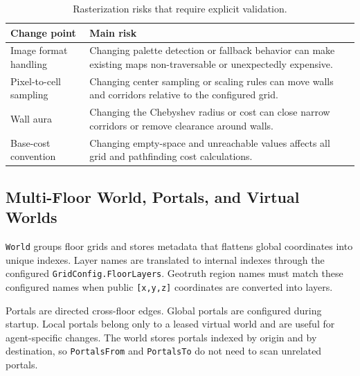 \documentclass[12pt,a4paper]{report}
\begin{document}
\begin{table}[H]
\centering
\begin{tabular}{|p{}|p{}|}
\hline
\textbf{Change point} & \textbf{Main risk} \\
\hline
Image format handling &
Changing palette detection or fallback behavior can make existing maps
non-traversable or unexpectedly expensive. \\
\hline
Pixel-to-cell sampling &
Changing center sampling or scaling rules can move walls and corridors relative
to the configured grid. \\
\hline
Wall aura &
Changing the Chebyshev radius or cost can close narrow corridors or remove
clearance around walls. \\
\hline
Base-cost convention &
Changing empty-space and unreachable values affects all grid and pathfinding
cost calculations. \\
\hline
\end{tabular}
\caption{Rasterization risks that require explicit validation.}
\end{table}

\subsection{Multi-Floor World, Portals, and Virtual Worlds}

\texttt{World} groups floor grids and stores metadata that flattens global
coordinates into unique indexes. Layer names are translated to internal indexes
through the configured \newline \texttt{GridConfig.FloorLayers}. Geotruth region names
must match these configured names when public \texttt{[x,y,z]} coordinates are
converted into layers.

Portals are directed cross-floor edges. Global portals are configured during
startup. Local portals belong only to a leased virtual world and are useful for
agent-specific changes. The world stores portals indexed by origin and by
destination, so \texttt{PortalsFrom} and \texttt{PortalsTo} do not need to scan
unrelated portals.
\end{document}
